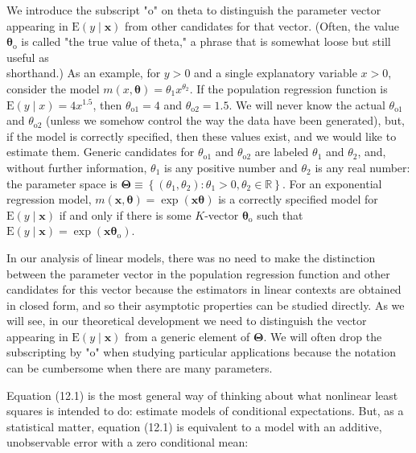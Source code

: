 \documentclass[10pt]{article}
\begin{document}
We introduce the subscript "o" on theta to distinguish the parameter vector appearing in $\mathrm{E}(y \mid \mathbf{x})$ from other candidates for that vector. (Often, the value $\boldsymbol{\theta}_{\mathrm{o}}$ is called "the true value of theta," a phrase that is somewhat loose but still useful as\\
shorthand.) As an example, for $y>0$ and a single explanatory variable $x>0$, consider the model $m(x, \boldsymbol{\theta})=\theta_{1} x^{\theta_{2}}$. If the population regression function is $\mathrm{E}(y \mid x)=4 x^{1.5}$, then $\theta_{\mathrm{o} 1}=4$ and $\theta_{\mathrm{o} 2}=1.5$. We will never know the actual $\theta_{\mathrm{o} 1}$ and $\theta_{\mathrm{o} 2}$ (unless we somehow control the way the data have been generated), but, if the model is correctly specified, then these values exist, and we would like to estimate them. Generic candidates for $\theta_{\mathrm{o} 1}$ and $\theta_{\mathrm{o} 2}$ are labeled $\theta_{1}$ and $\theta_{2}$, and, without further information, $\theta_{1}$ is any positive number and $\theta_{2}$ is any real number: the parameter space is $\boldsymbol{\Theta} \equiv\left\{\left(\theta_{1}, \theta_{2}\right): \theta_{1}>0, \theta_{2} \in \mathbb{R}\right\}$. For an exponential regression model, $m(\mathbf{x}, \boldsymbol{\theta})=\exp (\mathbf{x} \boldsymbol{\theta})$ is a correctly specified model for $\mathrm{E}(y \mid \mathbf{x})$ if and only if there is some $K$-vector $\boldsymbol{\theta}_{\mathrm{o}}$ such that $\mathrm{E}(y \mid \mathbf{x})=\exp \left(\mathbf{x} \boldsymbol{\theta}_{\mathrm{o}}\right)$.

In our analysis of linear models, there was no need to make the distinction between the parameter vector in the population regression function and other candidates for this vector because the estimators in linear contexts are obtained in closed form, and so their asymptotic properties can be studied directly. As we will see, in our theoretical development we need to distinguish the vector appearing in $\mathrm{E}(y \mid \mathbf{x})$ from a generic element of $\boldsymbol{\Theta}$. We will often drop the subscripting by "o" when studying particular applications because the notation can be cumbersome when there are many parameters.

Equation (12.1) is the most general way of thinking about what nonlinear least squares is intended to do: estimate models of conditional expectations. But, as a statistical matter, equation (12.1) is equivalent to a model with an additive, unobservable error with a zero conditional mean:
\end{document}
